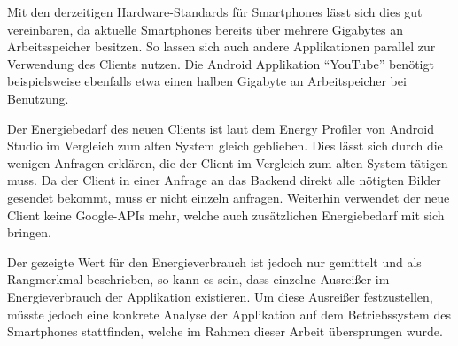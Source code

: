 Mit den derzeitigen Hardware-Standards für Smartphones lässt sich dies gut vereinbaren, da aktuelle Smartphones bereits über mehrere Gigabytes an Arbeitsspeicher besitzen.
So lassen sich auch andere Applikationen parallel zur Verwendung des Clients nutzen.
Die Android Applikation "`YouTube"' benötigt beispielsweise ebenfalls etwa einen halben Gigabyte an Arbeitspeicher bei Benutzung.

Der Energiebedarf des neuen Clients ist laut dem Energy Profiler von Android Studio im Vergleich zum alten System gleich geblieben.
Dies lässt sich durch die wenigen Anfragen erklären, die der Client im Vergleich zum alten System tätigen muss.
Da der Client in einer Anfrage an das Backend direkt alle nötigten Bilder gesendet bekommt, muss er nicht einzeln anfragen.
Weiterhin verwendet der neue Client keine Google-APIs mehr, welche auch zusätzlichen Energiebedarf mit sich bringen.

Der gezeigte Wert für den Energieverbrauch ist jedoch nur gemittelt und als Rangmerkmal beschrieben, so kann es sein, dass einzelne Ausreißer im Energieverbrauch der Applikation existieren. Um diese Ausreißer festzustellen, müsste jedoch eine konkrete Analyse der Applikation auf dem Betriebssystem des Smartphones stattfinden, welche im Rahmen dieser Arbeit übersprungen wurde.
